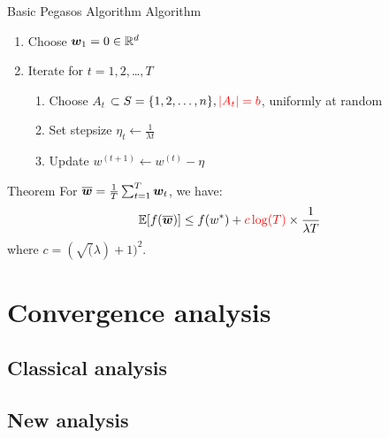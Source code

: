 \begin{frame}{Basic Pegasos Algorithm}
    Algorithm
    \begin{enumerate} 
        \item Choose $\bm{w}_1 = 0 \in \mathbb{R}^d$
        \item Iterate for $t = 1,2,$\ldots$,T$
        \begin{enumerate}
            \item Choose {\color{red} $A_t$} $\subset S = \{1,2,\ldots,n\},{\color{red}|A_t|=b}$, uniformly at random
            \item Set stepsize $\eta_t \leftarrow \frac{1}{\lambda t}$
            \item Update $w^{(t+1)} \leftarrow w^{(t)} - \eta$
        \end{enumerate}
    \end{enumerate}

    Theorem
    For $\overline{\bm{w}} = \frac1T \sum_{t=1}^T \bm{w}_t $, we have:
    \[
        \mathbb{E}[f(\overline{\bm{w}})]\le f(w^*) + {\color{red} c\log(T)}\times \frac{1}{\lambda T}
    \]
    where $c=(\sqrt(\lambda)+1)^2$.
\end{frame}
\section{Convergence analysis}
\subsection{Classical analysis}

\subsection{New analysis}

